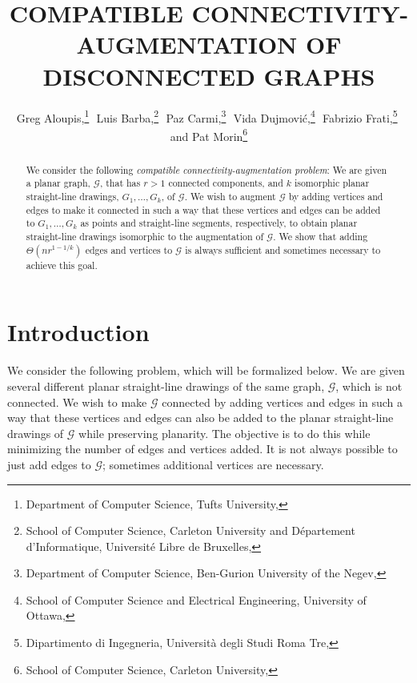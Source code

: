 \documentclass{patmorin}
\title{\MakeUppercase{Compatible Connectivity-Augmentation \newline of Disconnected Graphs}}
\author{Greg Aloupis,\thanks{Department of Computer Science, Tufts University, 
                             \email{aloupis.greg@gmail.com}}\,\,
       Luis Barba,\thanks{School of Computer Science, Carleton University
                          and Département d'Informatique, 
                          Université Libre de Bruxelles,
                          \email{lbarbafl@ulb.ac.be}}\,\,
       Paz Carmi,\thanks{Department of Computer Science,
                         Ben-Gurion University of the Negev,
                         \email{carmip@cs.bgu.ac.il}}\,\,
       Vida Dujmović,\thanks{School of Computer Science 
                             and Electrical Engineering,
                             University of Ottawa,
                             \email{vida@cs.mcgill.ca}}\,\,
       Fabrizio Frati,\thanks{Dipartimento di Ingegneria,
                              Università degli Studi Roma Tre,
                              \email{frati@dia.uniroma3.it}}\,\,
       and Pat Morin\thanks{School of Computer Science, Carleton University,
                            \email{morin@scs.carleton.ca}}}
\begin{document}
\begin{titlepage}

\maketitle
\begin{abstract}
\setlength{\baselineskip}{16.8pt}
We consider the following \emph{compatible connectivity-augmentation
problem}: We are given a planar graph,
$\mathcal{G}$, that has $r>1$ connected components, and $k$ isomorphic planar straight-line drawings, $G_1,\ldots,G_k$, of
$\mathcal{G}$. We wish to augment $\mathcal G$ by adding  vertices and edges to make
it connected in such a way that these vertices and edges can be added to $G_1,\ldots,G_k$ as points and straight-line segments, respectively, to obtain planar straight-line drawings isomorphic to the augmentation of $\mathcal G$.  We show that
adding $\Theta(nr^{1-1/k})$ edges and vertices to $\mathcal{G}$ is always
sufficient and sometimes necessary to achieve this goal.
\end{abstract}

\end{titlepage}


\section{Introduction}
\vspace{-.1in}
We consider the following problem, which will be formalized
below.  We are given several different planar straight-line drawings
of the same graph, $\mathcal G$, which is not connected.
We wish to make $\mathcal G$ connected by adding vertices and edges in
such a way that these vertices and edges can also be added to the planar
straight-line drawings of $\mathcal G$ while preserving planarity.  The objective is to do this while minimizing the number
of edges and vertices added. It is not always possible to just add edges to $\mathcal G$; sometimes additional vertices are necessary.
\end{document}
